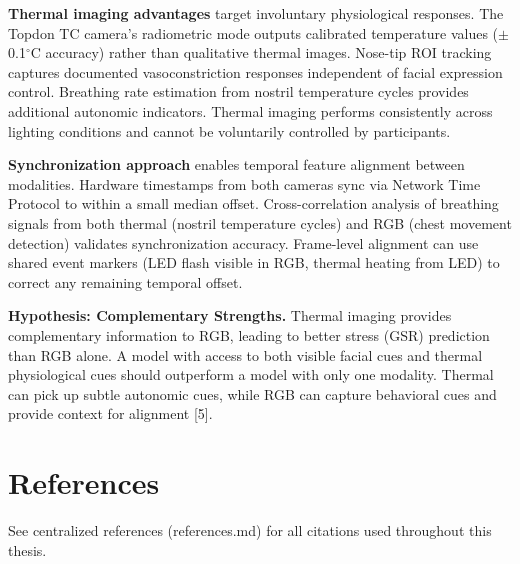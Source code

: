 \textbf{Thermal imaging advantages} target involuntary physiological responses. The Topdon TC camera's radiometric mode outputs calibrated temperature values ($\pm$0.1$^\circ$C accuracy) rather than qualitative thermal images. Nose-tip ROI tracking captures documented vasoconstriction responses independent of facial expression control. Breathing rate estimation from nostril temperature cycles provides additional autonomic indicators. Thermal imaging performs consistently across lighting conditions and cannot be voluntarily controlled by participants.

\textbf{Synchronization approach} enables temporal feature alignment between modalities. Hardware timestamps from both cameras sync via Network Time Protocol to within a small median offset. Cross-correlation analysis of breathing signals from both thermal (nostril temperature cycles) and RGB (chest movement detection) validates synchronization accuracy. Frame-level alignment can use shared event markers (LED flash visible in RGB, thermal heating from LED) to correct any remaining temporal offset.

\textbf{Hypothesis: Complementary Strengths.} Thermal imaging provides complementary information to RGB, leading to better stress (GSR) prediction than RGB alone. A model with access to both visible facial cues and thermal physiological cues should outperform a model with only one modality. Thermal can pick up subtle autonomic cues, while RGB can capture behavioral cues and provide context for alignment [5].

\section*{References}
See centralized references (references.md) for all citations used throughout this thesis.
